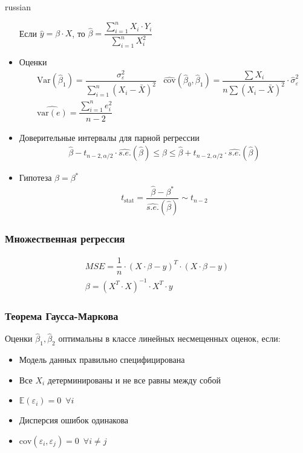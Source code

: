\documentclass[9pt]{article}
\begin{document}
\begin{otherlanguage*}{russian}
\begin{itemize}
Если $ \hat y = \beta \cdot X $, то $ \hat \beta = \dfrac{\sum_{i=1}^n X_i \cdot Y_i}{\sum_{i=1}^n X_i^2} $
\item Оценки 
\begin{align*}
&\text{Var}( \hat \beta_1 ) = \dfrac{\sigma_{\varepsilon}^2}{\sum_{i=1}^n (X_i - \bar{X})^2} 
&\widehat{\text{cov}} ( \hat \beta_0, \hat \beta_1) = \dfrac{\sum X_i}{n \sum (X_i - \bar{X})^2} \cdot \hat \sigma_{\varepsilon}^2 \\
& \widehat{\text{var} (e)} = \dfrac{\sum_{i=1}^n e_i^2}{n-2}
\end{align*}
\item Доверительные интервалы для парной регрессии
\begin{align*}
\hat \beta - t_{n-2, \alpha / 2} \cdot \widehat{s.e.} (\hat \beta) \le \beta \le \hat \beta + t_{n-2, \alpha / 2} \cdot \widehat{s.e.} (\hat \beta)
\end{align*}
\item Гипотеза $ \beta = \beta^* $
\begin{align*}
t_{\text{stat}} = \dfrac{\hat \beta - \beta^*}{\widehat{s.e.}(\hat \beta)} \sim t_{n-2}
\end{align*}
\end{itemize}
\subsubsection*{Множественная регрессия}
\begin{align*}
MSE = \dfrac{1}{n} \cdot (X \cdot \beta - y)^T \cdot (X \cdot \beta - y) \\
\beta =  (X^T \cdot X)^{-1} \cdot X^T \cdot y 
\end{align*}
\subsubsection*{Теорема Гаусса-Маркова}
Оценки $\hat \beta_1, \hat \beta_2 $ оптимальны в классе линейных несмещенных оценок, если:
\begin{itemize}
\item Модель данных правильно специфицирована
\item Все $ X_i$ детерминированы и не все равны между собой
\item $\mathbb{E} (\varepsilon_i) = 0 \,\,\, \forall i $
\item Дисперсия ошибок одинакова
\item $\text{cov} (\varepsilon_i, \varepsilon_j) = 0 \,\,\, \forall i \ne j $
\end{itemize}
\end{otherlanguage*} 
\end{document}
